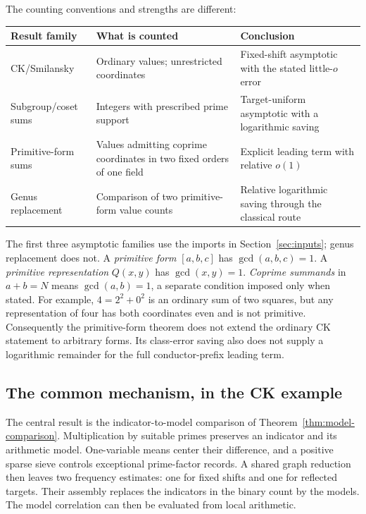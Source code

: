 The counting conventions and strengths are different:
\begin{center}\small
\begin{tabular}{@{}>{\raggedright\arraybackslash}p{.19\linewidth}>{\raggedright\arraybackslash}p{.34\linewidth}>{\raggedright\arraybackslash}p{.41\linewidth}@{}}
\hline
Result family&What is counted&Conclusion\\\hline
CK/Smilansky&Ordinary values; unrestricted coordinates&Fixed-shift asymptotic with the stated little-\(o\) error\\[1mm]
Subgroup/coset sums&Integers with prescribed prime support&Target-uniform asymptotic with a logarithmic saving\\[1mm]
Primitive-form sums&Values admitting coprime coordinates in two fixed orders of one field&Explicit leading term with relative \(o(1)\)\\[1mm]
Genus replacement&Comparison of two primitive-form value counts&Relative logarithmic saving through the classical route\\\hline
\end{tabular}
\end{center}
The first three asymptotic families use the imports in
Section~\ref{sec:inputs}; genus replacement does not.
A \emph{primitive form} \([a,b,c]\) has \(\gcd(a,b,c)=1\).
A \emph{primitive representation} \(Q(x,y)\) has
\(\gcd(x,y)=1\). \emph{Coprime summands} in \(a+b=N\)
means \(\gcd(a,b)=1\), a separate condition imposed only when stated.
For example, \(4=2^2+0^2\) is an ordinary sum of two squares,
but any representation of four has both coordinates even and is
not primitive. Consequently the primitive-form theorem does not
extend the ordinary CK statement to arbitrary forms. Its class-error
saving also does not supply a logarithmic remainder for the full
conductor-prefix leading term.

\subsection{The common mechanism, in the CK example}

The central result is the indicator-to-model comparison of
Theorem~\ref{thm:model-comparison}. Multiplication by suitable primes
preserves an indicator and its arithmetic model. One-variable means
center their difference, and a positive sparse sieve controls exceptional
prime-factor records. A shared graph reduction then leaves two frequency
estimates: one for fixed shifts and one for reflected targets. Their
assembly replaces the indicators in the binary count by the models.
The model correlation can then be evaluated from local arithmetic.

